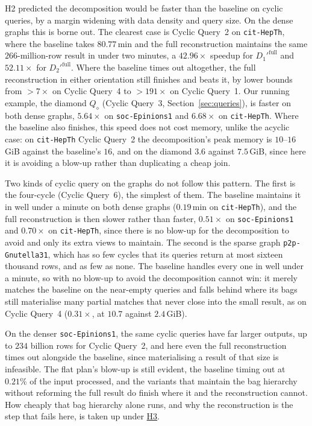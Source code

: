 H2 predicted the decomposition would be faster than the baseline on cyclic queries, by a margin widening with data density and query size. On the dense graphs this is borne out. The clearest case is Cyclic Query~2 on \texttt{cit-HepTh}, where the baseline takes $80.77$\,min and the full reconstruction maintains the same $266$-million-row result in under two minutes, a $42.96\times$ speedup for $D_1'^{\text{full}}$ and $52.11\times$ for $D_2'^{\text{full}}$. Where the baseline times out altogether, the full reconstruction in either orientation still finishes and beats it, by lower bounds from $>7\times$ on Cyclic Query~4 to $>191\times$ on Cyclic Query~1. Our running example, the diamond $Q_\diamond$ (Cyclic Query~3, Section~\ref{sec:queries}), is faster on both dense graphs, $5.64\times$ on \texttt{soc-Epinions1} and $6.68\times$ on \texttt{cit-HepTh}. Where the baseline also finishes, this speed does not cost memory, unlike the acyclic case: on \texttt{cit-HepTh} Cyclic Query~2 the decomposition's peak memory is $10$--$16$\,GiB against the baseline's $16$, and on the diamond $3.6$ against $7.5$\,GiB, since here it is avoiding a blow-up rather than duplicating a cheap join.

Two kinds of cyclic query on the graphs do not follow this pattern. The first is the four-cycle (Cyclic Query~6), the simplest of them. The baseline maintains it in well under a minute on both dense graphs ($0.19$\,min on \texttt{cit-HepTh}), and the full reconstruction is then slower rather than faster, $0.51\times$ on \texttt{soc-Epinions1} and $0.70\times$ on \texttt{cit-HepTh}, since there is no blow-up for the decomposition to avoid and only its extra views to maintain. The second is the sparse graph \texttt{p2p-Gnutella31}, which has so few cycles that its queries return at most sixteen thousand rows, and as few as none. The baseline handles every one in well under a minute, so with no blow-up to avoid the decomposition cannot win: it merely matches the baseline on the near-empty queries and falls behind where its bags still materialise many partial matches that never close into the small result, as on Cyclic Query~4 ($0.31\times$, at $10.7$ against $2.4$\,GiB).

On the denser \texttt{soc-Epinions1}, the same cyclic queries have far larger outputs, up to $234$ billion rows for Cyclic Query~2, and here even the full reconstruction times out alongside the baseline, since materialising a result of that size is infeasible. The flat plan's blow-up is still evident, the baseline timing out at $0.21\%$ of the input processed, and the variants that maintain the bag hierarchy without reforming the full result do finish where it and the reconstruction cannot. How cheaply that bag hierarchy alone runs, and why the reconstruction is the step that fails here, is taken up under \hyperlink{h3}{H3}.

